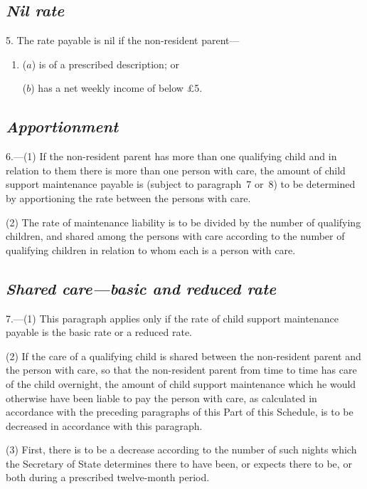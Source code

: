 \documentclass[12pt,a4paper]{article}
\begin{document}
\subsection*{\itshape Nil rate}

5. The rate payable is nil if the non-resident parent—
\begin{enumerate}\item[]
($a$) is of a prescribed description; or

($b$) has a net weekly income of below £5. 
\end{enumerate}

\subsection*{\itshape Apportionment}

6.---(1) If the non-resident parent has more than one qualifying child and in relation to them there is more than one person with care, the amount of child support maintenance payable is (subject to paragraph~7 or~8) to be determined by apportioning the rate between the persons with care.

(2) The rate of maintenance liability is to be divided by the number of qualifying children, and shared among the persons with care according to the number of qualifying children in relation to whom each is a person with care.

\subsection*{\itshape Shared care—basic and reduced rate}

7.---(1) This paragraph applies only if the rate of child support maintenance payable is the basic rate or a reduced rate.

(2) If the care of a qualifying child is shared between the non-resident parent and the person with care, so that the non-resident parent from time to time has care of the child overnight, the amount of child support maintenance which he would otherwise have been liable to pay the person with care, as calculated in accordance with the preceding paragraphs of this Part of this Schedule, is to be decreased in accordance with this paragraph.

(3) First, there is to be a decrease according to the number of such nights which the Secretary of State determines there to have been, or expects there to be, or both during a prescribed twelve-month period.
\end{document}
